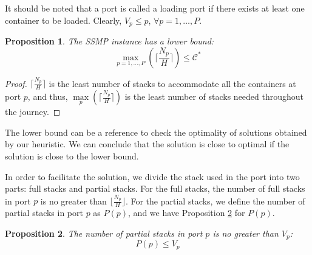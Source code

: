 \documentclass[review,3p,times,authoryear,12pt]{elsarticle}
\newtheorem{proposition}{Proposition}
\begin{document}
It should be noted that a port is called a loading port if there exists at least one container to be loaded. Clearly, $V_p \le p$, $\forall p=1,\ldots,P$.

\begin{proposition}
The SSMP instance has a lower bound:
\begin{equation*}
\max\limits_{p=1,\ldots,P}(\lceil\frac{N_p}{H}\rceil) \le \mathcal C^*
\end{equation*}
\label{pro:a1}
\end{proposition}

\begin{proof}

$\lceil\frac{N_p}{H}\rceil$ is the least number of stacks to accommodate all the containers at port $p$, and thus, $\max\limits_p(\lceil\frac{N_p}{H}\rceil)$ is the least number of stacks needed throughout the journey.
\end{proof}

The lower bound can be a reference to check the optimality of solutions obtained by our heuristic.
We can conclude that the solution is close to optimal if the solution is close to the lower bound.

In order to facilitate the solution, we divide the stack used in the port into two parts: full stacks and partial stacks.
For the full stacks, the number of full stacks in port $p$ is no greater than $\lfloor\frac{N_p}{H}\rfloor$.
For the partial stacks, we define the number of partial stacks in port $p$ as $P(p)$, and we have Proposition \ref{pro:a2} for $P(p)$.
\begin{proposition}
The number of partial stacks in port $p$ is no greater than $V_p$:
\begin{equation*}
 P(p) \le  V_p
\end{equation*}
\label{pro:a2}
\end{proposition}
\end{document}
